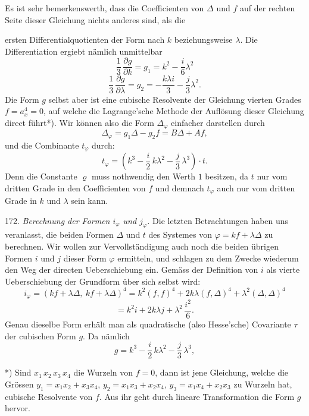 Es ist sehr bemerkenswerth, dass die Coefficienten von $\Delta$ und $f$ auf der rechten Seite dieser Gleichung nichts anderes sind, als die


ersten Differentialquotienten der Form
nach $k$ beziehungsweise $\lambda$. Die Differentiation ergiebt nämlich unmittelbar
\[
\frac{1}{3}\,\frac{\partial g}{\partial k} = g_1 = k^2 - \frac{i}{6}\lambda^2
\]
\[
\frac{1}{3}\,\frac{\partial g}{\partial \lambda} = g_2 = -\frac{k\lambda i}{3} - \frac{j}{3}\lambda^2 .
\]
Die Form $g$ selbst aber ist eine cubische Resolvente der Gleichung
vierten Grades $f = a_x^4 = 0$, auf welche die Lagrange'sche Methode der
Auflösung dieser Gleichung direct führt*). Wir können also die Form
$\varDelta_\varphi$ einfacher darstellen durch
\[
\varDelta_\varphi = g_1\varDelta - g_2 f = B\varDelta + Af,
\]
und die Combinante $t_\varphi$ durch:
\[
t_\varphi = \left(k^3 - \frac{i}{2}\,k\lambda^2 - \frac{j}{3}\,\lambda^3\right)\cdot t .
\]
Denn die Constante $\varrho$ muss nothwendig den Werth $1$ besitzen,
da $t$ nur vom dritten Grade in den Coefficienten von $f$ und demnach
$t_\varphi$ auch nur vom dritten Grade in $k$ und $\lambda$ sein kann.

172. \textit{Berechnung der Formen $i_\varphi$ und $j_\varphi$.} Die letzten Betrachtungen
haben uns veranlasst, die beiden Formen $\varDelta$ und $t$ des Systemes von
$\varphi = kf + \lambda\varDelta$ zu berechnen. Wir wollen zur Vervollständigung auch
noch die beiden übrigen Formen $i$ und $j$ dieser Form $\varphi$ ermitteln,
und schlagen zu dem Zwecke wiederum den Weg der directen Ueberschiebung ein. Gemäss der Definition von $i$ als vierte Ueberschiebung
der Grundform über sich selbst wird:
\[
i_\varphi = (kf+\lambda\varDelta,\ kf+\lambda\varDelta)^4 = k^2(f,f)^4 + 2k\lambda(f,\varDelta)^4 + \lambda^2(\varDelta,\varDelta)^4
\]
\[
= k^2 i + 2k\lambda j + \lambda^2\,\frac{i^2}{6}.
\]
Genau dieselbe Form erhält man als quadratische (also Hesse'sche)
Covariante $\tau$ der cubischen Form $g$. Da nämlich
\[
g = k^3 - \frac{i}{2}\,k\lambda^2 - \frac{j}{3}\,\lambda^3,
\]

*) Sind $x_1\,x_2\,x_3\,x_4$ die Wurzeln von $f=0$, dann ist jene Gleichung, welche
die Grössen $y_1 = x_1x_2+x_3x_4$, $y_2 = x_1x_3+x_2x_4$, $y_3 = x_1x_4+x_2x_3$ zu Wurzeln
hat, cubische Resolvente von $f$. Aus ihr geht durch lineare Transformation die
Form $g$ hervor.


